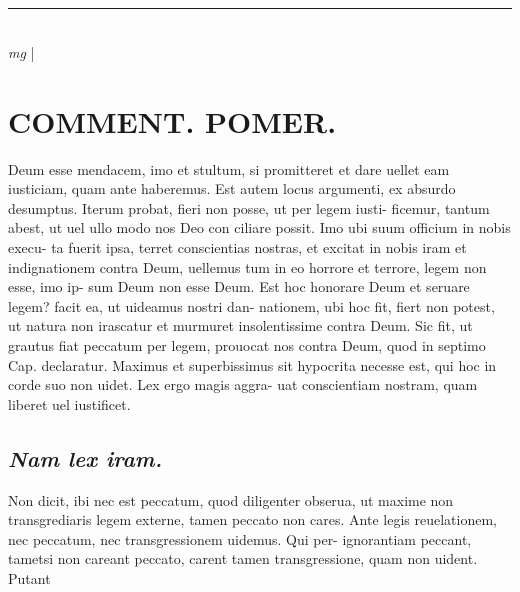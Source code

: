 \documentclass{article}
\begin{document}
\begin{pages}
\subsection*{\textit{ }}
{}
\subsection*{\textit{ }}
{}
\subsection*{\textit{ }}\pstart   \pend
\vspace{0.5cm}\noindent
\vspace{0.2cm}\rule{1cm}{0.2pt}\\ 
\hspace{0.2cm}\textit{mg}
\footnotesize   
\normalsize| 
\section*{COMMENT. POMER.  }\pstart Deum esse mendacem, imo et stultum, si promitteret et dare uellet eam iusticiam, quam ante haberemus.  Est autem locus argumenti, ex absurdo desumptus.   \pend\pstart Iterum probat, fieri non posse, ut per legem iusti- ficemur, tantum abest, ut uel ullo modo nos Deo con ciliare possit. Imo ubi suum officium in nobis execu- ta fuerit ipsa, terret conscientias nostras, et excitat in nobis iram et indignationem contra Deum, uellemus tum in eo horrore et terrore, legem non esse, imo ip- sum Deum non esse Deum. Est hoc honorare Deum et seruare legem? facit ea, ut uideamus nostri dan- nationem, ubi hoc fit, fiert non potest, ut natura non irascatur et murmuret insolentissime contra Deum.  Sic fit, ut grautus fiat peccatum per legem, prouocat nos contra Deum, quod in septimo Cap. declaratur.  Maximus et superbissimus sit hypocrita necesse est, qui hoc in corde suo non uidet. Lex ergo magis aggra- uat conscientiam nostram, quam liberet uel iustificet.   \pend
{}
{}
\subsection*{\textit{Nam lex iram. }}\pstart Non dicit, ibi nec est peccatum, quod diligenter obserua, ut maxime non transgrediaris legem externe, tamen peccato non cares. Ante legis reuelationem, nec peccatum, nec transgressionem uidemus. Qui per- ignorantiam peccant, tametsi non careant peccato, carent tamen transgressione, quam non uident. Putant  \pend
{}
{}

\end{pages}
\end{document}
